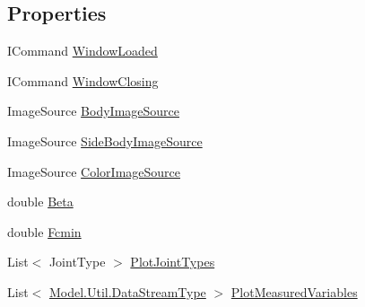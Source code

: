 \subsection*{Properties}
\begin{DoxyCompactItemize}
\item 
I\+Command \hyperlink{class_rowing_monitor_1_1_view_model_1_1_main_view_model_a41b14c5d964f16872ba4ff7e902d086a}{Window\+Loaded}
\item 
I\+Command \hyperlink{class_rowing_monitor_1_1_view_model_1_1_main_view_model_abf7344a3fb92d215e85568c2b8ea2413}{Window\+Closing}
\item 
Image\+Source \hyperlink{class_rowing_monitor_1_1_view_model_1_1_main_view_model_a8db6c0be0de3d081ecc1cfd4e29f63ea}{Body\+Image\+Source}
\item 
Image\+Source \hyperlink{class_rowing_monitor_1_1_view_model_1_1_main_view_model_a855a4d13248cb58ac588e6993674f371}{Side\+Body\+Image\+Source}
\item 
Image\+Source \hyperlink{class_rowing_monitor_1_1_view_model_1_1_main_view_model_a6a3397050ea6774eabf6118819a183a0}{Color\+Image\+Source}
\item 
double \hyperlink{class_rowing_monitor_1_1_view_model_1_1_main_view_model_aea1ee41eb29904df4dd08c781def6bd2}{Beta}
\item 
double \hyperlink{class_rowing_monitor_1_1_view_model_1_1_main_view_model_a4008baa81a327f935e14c4024b5b0d9d}{Fcmin}
\item 
List$<$ Joint\+Type $>$ \hyperlink{class_rowing_monitor_1_1_view_model_1_1_main_view_model_a0b81c01247d969c5e5f3ba913f48c31d}{Plot\+Joint\+Types}
\item 
List$<$ \hyperlink{namespace_rowing_monitor_1_1_model_1_1_util_a01e1a06061533b246feb7421c9d0107f}{Model.\+Util.\+Data\+Stream\+Type} $>$ \hyperlink{class_rowing_monitor_1_1_view_model_1_1_main_view_model_a6887b1eb891b47726c699746a480e9fb}{Plot\+Measured\+Variables}

\end{DoxyCompactItemize}
